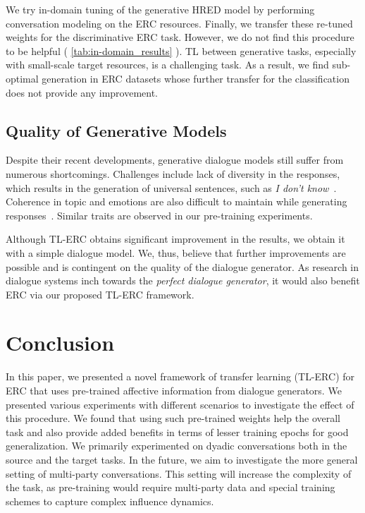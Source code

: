\documentclass[preprint,3pt]{elsarticle}
\begin{document}
We try in-domain tuning of the generative HRED model by performing conversation modeling on the ERC resources. Finally, we transfer these re-tuned weights for the discriminative ERC task. However, we do not find this procedure to be helpful ( \cref{tab:in-domain_results} ). TL between generative tasks, especially with small-scale target resources, is a challenging task. As a result, we find sub-optimal generation in ERC datasets whose further transfer for the classification does not provide any improvement.

\subsection{Quality of Generative Models}

Despite their recent developments, generative dialogue models still suffer from numerous shortcomings. Challenges include lack of diversity in the responses, which results in the generation of universal sentences, such as \textit{I don't know}~\cite{li-etal-2016-diversity,DBLP:conf/ijcai/SongLNZZY18}. Coherence in topic and emotions are also difficult to maintain while generating responses~\cite{DBLP:conf/aaai/ZhouHZZL18}. Similar traits are observed in our pre-training experiments. 

Although TL-ERC obtains significant improvement in the results, we obtain it with a simple dialogue model. We, thus, believe that further improvements are possible and is contingent on the quality of the dialogue generator. As research in dialogue systems inch towards the \textit{perfect dialogue generator}, it would also benefit ERC via our proposed TL-ERC framework.

\section{Conclusion} \label{sec:conclusion}

In this paper, we presented a novel framework of transfer learning (TL-ERC) for ERC that uses pre-trained affective information from dialogue generators. We presented various experiments with different scenarios to investigate the effect of this procedure. We found that using such pre-trained weights help the overall task and also provide added benefits in terms of lesser training epochs for good generalization. We primarily experimented on dyadic conversations both in the source and the target tasks. In the future, we aim to investigate the more general setting of multi-party conversations. This setting will increase the complexity of the task, as pre-training would require multi-party data and special training schemes to capture complex influence dynamics.
\end{document}
